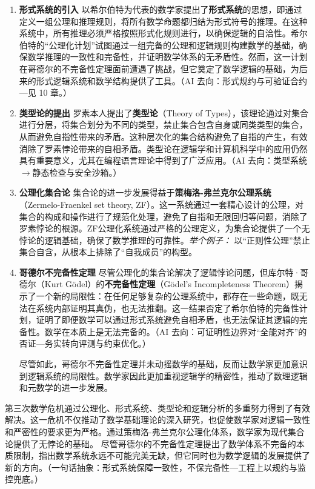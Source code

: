 \begin{enumerate}
\item {\bf 形式系统的引入}
以希尔伯特为代表的数学家提出了{\bf 形式系统}的思想，即通过定义一组公理和推理规则，将所有数学命题都归结为形式符号的推理。在这种系统中，所有推理必须严格按照形式化规则进行，以确保逻辑的自洽性。希尔伯特的“公理化计划”试图通过一组完备的公理和逻辑规则构建数学的基础，确保数学推理的一致性和完备性，并证明数学体系的无矛盾性。然而，这一计划在哥德尔的不完备性定理面前遭遇了挑战，但它奠定了数学逻辑的基础，为后来的形式逻辑系统和数学结构提供了工具。{（AI 去向：形式规约与可验证合约—见 10 章。）}

\item {\bf 类型论的提出}
罗素本人提出了{\bf 类型论}（Theory of Types），该理论通过对集合进行分层，将集合划分为不同的类型，禁止集合包含自身或同类类型的集合，从而避免自指性带来的矛盾。这种层次化的集合结构避免了自指的产生，有效消除了罗素悖论带来的自相矛盾。类型论在逻辑学和计算机科学中的应用仍然具有重要意义，尤其在编程语言理论中得到了广泛应用。{（AI 去向：类型系统$\rightarrow$静态检查与安全沙箱。）}

\item {\bf 公理化集合论}
集合论的进一步发展得益于{\bf 策梅洛-弗兰克尔公理系统}（Zermelo-Fraenkel set theory, ZF）。这一系统通过一套精心设计的公理，对集合的构成和操作进行了规范化处理，避免了自指和无限回归等问题，消除了罗素悖论的根源。ZF公理化系统通过严格的公理定义，为集合论提供了一个无悖论的逻辑基础，确保了数学推理的可靠性。{{\itshape 举个例子：} 以“正则性公理”禁止集合自含，从根本上排除了“自我成员”的构型。}

\item {\bf 哥德尔不完备性定理}
尽管公理化的集合论解决了逻辑悖论问题，但库尔特·哥德尔（Kurt Gödel）的{\bf 不完备性定理}（Gödel's Incompleteness Theorem）揭示了一个新的局限性：在任何足够复杂的公理系统中，都存在一些命题，既无法在系统内部证明其真伪，也无法推翻。这一结果否定了希尔伯特的完备性计划，证明了即便数学可以通过形式系统避免自相矛盾，也无法保证其逻辑的完备性。数学在本质上是无法完备的。{（AI 去向：可证明性边界对“全能对齐”的否证—务实转向评测与约束优化。）}

尽管如此，哥德尔不完备性定理并未动摇数学的基础，反而让数学家更加意识到逻辑系统的局限性。数学家因此更加重视逻辑学的精密性，推动了数理逻辑和元数学的进一步发展。
\end{enumerate}


第三次数学危机通过公理化、形式系统、类型论和逻辑分析的多重努力得到了有效解决。这一危机不仅推动了数学基础理论的深入研究，也促使数学家对逻辑一致性和严密性的要求更为严格。通过策梅洛-弗兰克尔公理化体系，数学家为现代集合论提供了无悖论的基础。
尽管哥德尔的不完备性定理提出了数学体系不完备的本质限制，指出数学系统永远不可能完美无缺，但它同时也为数学逻辑的发展提供了新的方向。{（一句话抽象：形式系统保障一致性，不保完备性—工程上以规约与监控兜底。）}

